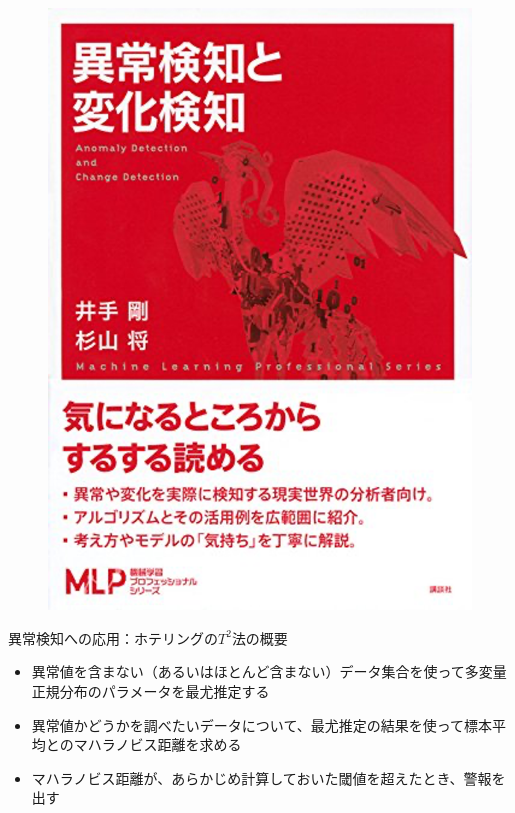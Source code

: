 \documentclass[aspectratio=169,unicode,dvipdfmx,14pt]{beamer}
\begin{document}
\begin{frame}
\begin{figure}[htbp]
\begin{center}
\includegraphics[scale=.45]{book_anomaly.png}
\end{center}
\end{figure}
\end{frame}

\begin{frame}{異常検知への応用：ホテリングの$T^2$法の概要}
\begin{itemize}
\item 異常値を含まない（あるいはほとんど含まない）データ集合を使って多変量正規分布のパラメータを最尤推定する
\item 異常値かどうかを調べたいデータについて、最尤推定の結果を使って標本平均とのマハラノビス距離を求める
\item マハラノビス距離が、あらかじめ計算しておいた閾値を超えたとき、警報を出す
\end{itemize}
\end{frame}
\end{document}

